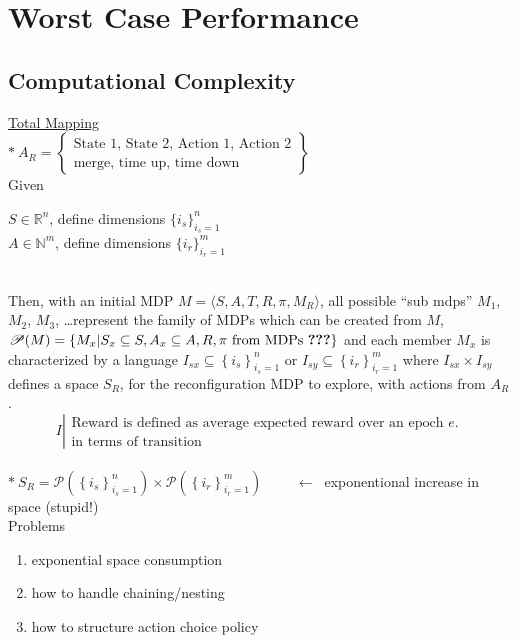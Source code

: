 \section{Worst Case Performance}
\label{sec:worstcase}

\subsection{Computational Complexity}
 \label{sec:complexity}

\underline{Total Mapping}\\

 
$\ast\ A_R = \left\{ \begin{array}{l} \text{State 1, State 2, Action 1, Action 2} \\ \text{merge, time up, time down} \end{array} \right\}$\\

Given\ 
\begin{minipage}[t]{0.7\textwidth}
$S\in\mathbb{R}^{n}$, define dimensions $\{i_s\}_{i_s=1}^{n}$ \\
$A\in \mathbb{N}^{m}$, define dimensions $\{i_r\}_{i_r=1}^{m}$
\end{minipage}\\

Then, with an initial MDP $M=\langle S, A, T, R, \pi, M_R \rangle$, all possible ``sub mdps'' $M_1$, $M_2$, $M_3$, \ldots represent the family of MDPs which can be created from $M$, $\mathscr{P}(M)=\left\{M_x | S_x \subseteq S, A_x\subseteq A, R, \pi \text{\ from MDPs \textbf{???}}\right\}$ and each member $M_x$ is characterized by a language $I_{sx}\subseteq \left\{i_s\right\}_{i_s=1}^{n}$ or $I_{sy}\subseteq\left\{i_r\right\}_{i_r=1}^{m}$ where $I_{sx}\times I_{sy}$ defines a space $S_R$, for the reconfiguration MDP to explore, with actions from $A_R$.\\

\begin{equation*}
I \left| \begin{array}{l}\text{Reward is defined as average expected reward over an epoch $e$.} \\ \text{in terms of transition} \end{array} \right.
\end{equation*}\\

$\ast\ S_R = \mathscr{P}\left(\left\{i_s\right\}_{i_s=1}^{n}\right)\times\mathscr{P}\left(\left\{i_r\right\}_{i_r=1}^{m}\right)$
$\qquad\longleftarrow\ $ exponentional increase in space (stupid!)
\\

Problems\ 
\begin{enumerate}[label=\arabic*)]
\item exponential space consumption
\item how to handle chaining/nesting
\item how to structure action choice policy
\end{enumerate}